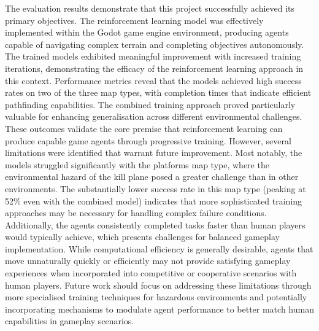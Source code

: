 The evaluation results demonstrate that this project successfully achieved its primary objectives. 
The reinforcement learning model was effectively implemented within the Godot game engine environment, producing agents capable of navigating complex terrain and completing objectives autonomously. 
The trained models exhibited meaningful improvement with increased training iterations, demonstrating the efficacy of the reinforcement learning approach in this context.
Performance metrics reveal that the models achieved high success rates on two of the three map types, with completion times that indicate efficient pathfinding capabilities. 
The combined training approach proved particularly valuable for enhancing generalisation across different environmental challenges. 
These outcomes validate the core premise that reinforcement learning can produce capable game agents through progressive training.
However, several limitations were identified that warrant future improvement. 
Most notably, the models struggled significantly with the platforms map type, where the environmental hazard of the kill plane posed a greater challenge than in other environments. 
The substantially lower success rate in this map type (peaking at 52\% even with the combined model) indicates that more sophisticated training approaches may be necessary for handling complex failure conditions.
Additionally, the agents consistently completed tasks faster than human players would typically achieve, which presents challenges for balanced gameplay implementation. 
While computational efficiency is generally desirable, agents that move unnaturally quickly or efficiently may not provide satisfying gameplay experiences when incorporated into competitive or cooperative scenarios with human players.
Future work should focus on addressing these limitations through more specialised training techniques for hazardous environments and potentially incorporating mechanisms to modulate agent performance to better match human capabilities in gameplay scenarios.